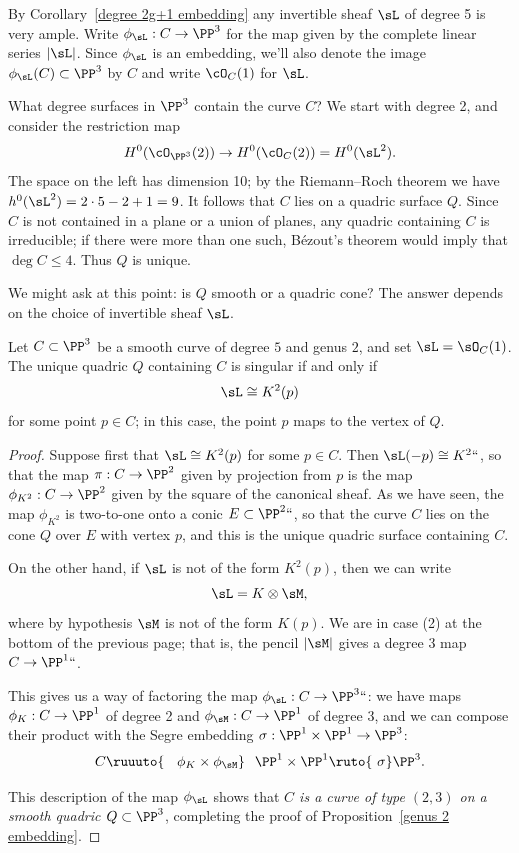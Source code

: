 By Corollary~\ref{degree 2g+1 embedding} any invertible sheaf $\sL$ of
%
%
degree 5 is very ample.
Write $\phi_\sL : C \to \PP^3$
for the map given by the complete linear
series $|\sL|$. Since $\phi_\sL$ is an embedding, we'll also denote the
image $\phi_\sL(C) \subset \PP^3$ by $C$ and write $\cO_C(1)$ for $\sL$.

What degree surfaces in $\PP^3$ contain the curve $C$? We start with
degree 2, and consider the restriction map
$$
H^0(\cO_{\PP^3}(2)) \to H^0(\cO_C(2)) = H^0(\sL^2).
$$
The space on the left has dimension 10; by the
Riemann--Roch theorem
%
we have $h^0(\sL^2) = 2\cdot5 - 2 + 1 = 9$. It follows that $C$ lies
on a quadric surface $Q$. Since $C$ is not contained in a plane or a
union of planes, any quadric containing $C$ is irreducible; if there
were more than one such,
B\'ezout's theorem
%
 would imply that $\deg C
\leq 4$. Thus $Q$ is unique.

We might ask at this point: is $Q$ smooth or a quadric cone? The answer
depends on the choice of invertible sheaf $\sL$.

\begin{proposition}
\label{genus 2 embedding}
Let $C \subset \PP^3$ be a smooth curve of degree $5$ and genus $2$, and
set $\sL = \sO_C(1)$. The unique quadric $Q$ containing $C$
  is singular if and only if
$$
\sL \cong K^2(p)
$$
for some point $p \in C$; in this case, the point $p$ maps to the vertex
of $Q$.
\end{proposition}

\begin{proof}

Suppose first that
$\sL \cong K^2(p)$ for some $p \in
C$. Then $\sL(-p) \cong K^2` `$, so that the map $\pi : C \to \PP^2$ given
by projection from $p$ is the map $\phi_{K^2} : C \to \PP^2$ given by
the square of the canonical sheaf. As we have seen, the map $\phi_{K^2}$
is two-to-one onto a conic $E \subset \PP^2` `$, so that the curve $C$
lies on the cone $Q$ over $E$ with vertex $p$, and this is the unique
quadric surface containing $C$.

On the other hand, if $\sL$ is not of the form $K^2(p)$, then we can write
$$
\sL = K \otimes \sM,
$$
where by hypothesis $\sM$ is not of the form $K(p)$.
We are in case (2) at the bottom of the previous page; that is,
the pencil $|\sM|$ gives a
degree 3 map $C \to \PP^1` `$.

This gives us a way of factoring the map $\phi_\sL : C \to \PP^3` `$: we
have maps $\phi_K : C \to \PP^1$ of degree 2 and $\phi_\sM : C \to \PP^1$
of degree 3, and we can compose their product with the
Segre embedding
%
$\sigma : \PP^1 \times \PP^1 \to \PP^3$:
$$
C\ruuuto {\hskip0.9em\phi_K \times \phi_\sM}\hskip0.7em
\PP^1 \times \PP^1  \ruto {\ \sigma}  \PP^3.
$$

This description of the map $\phi_\sL$  shows  that \emph{$C$ is a
curve of type $(2,3)$
on a smooth quadric $Q \subset \PP^3$}, completing the
proof of Proposition~\ref{genus 2 embedding}.
\end{proof}

